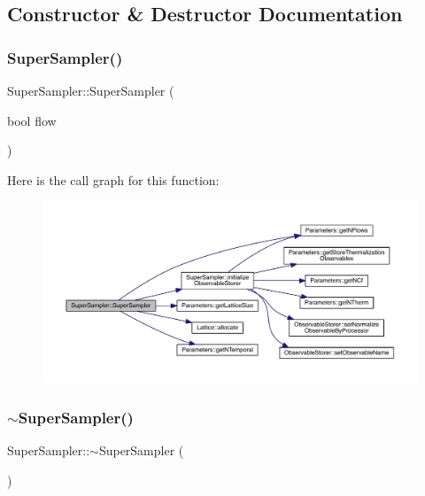 \subsection{Constructor \& Destructor Documentation}
\mbox{\label{class_super_sampler_a6bf01b68f9befc5bf01c822e28c0c88d}} 
\subsubsection{\texorpdfstring{SuperSampler()}{SuperSampler()}}
{\footnotesize\ttfamily Super\+Sampler\+::\+Super\+Sampler (\begin{DoxyParamCaption}\item[{bool}]{flow }\end{DoxyParamCaption})}

Here is the call graph for this function\+:
\nopagebreak
\begin{figure}[H]
\begin{center}
\leavevmode
\includegraphics[width=350pt]{class_super_sampler_a6bf01b68f9befc5bf01c822e28c0c88d_cgraph}
\end{center}
\end{figure}
\mbox{\label{class_super_sampler_a55e62dd765b7e85d629fb4ff07208d6d}} 
\subsubsection{\texorpdfstring{$\sim$SuperSampler()}{~SuperSampler()}}
{\footnotesize\ttfamily Super\+Sampler\+::$\sim$\+Super\+Sampler (\begin{DoxyParamCaption}{ }\end{DoxyParamCaption})}




